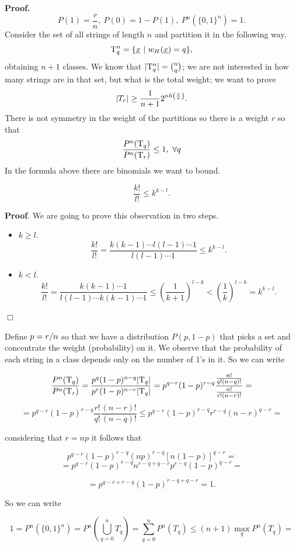 \noindent\textbf{Proof.} $$P(1) = \dfrac{r}{n},\ P(0) = 1 - P(1),\ P^n(\{0, 1\}^n) = 1.$$
Consider the set of all strings of length $n$ and partition it in the following way.
$$\mathrm{T}_q^n = \{\underline{x}\ |\ w_H(\underline{x}) = q\},$$
obtaining $n +1$ classes. 
We know that $|\mathrm{T}_q^n| = \binom{n}{q}$; we are not interested in how many strings are in that set, but what is the total weight; we want to prove $$ |T_r| \geq \dfrac{1}{n+1}2^{nh\left(\frac{r}{n}\right)}.$$ There is not symmetry in the weight of the partitions so there is a weight $r$ so that
$$ \dfrac{P^n(\mathrm{T}_q)}{P^n(\mathrm{T}_r)} \leq 1,\ \forall q$$
In the formula above there are binomials we want to bound.

\begin{obs}
	$$\dfrac{k!}{l!} \leq k^{k-l}.$$
\end{obs}

\noindent\textbf{Proof}. We are going to prove this observation in two steps.
\begin{itemize}
	\item $k \geq l$. 
	$$\dfrac{k!}{l!} = \dfrac{k(k-1) \cdots l(l -1) \cdots 1}{l(l -1) \cdots 1} \leq k^{k-l}.$$
	
	\item $k < l$.
	$$\dfrac{k!}{l!} = \dfrac{k(k-1) \cdots 1}{l(l -1) \cdots k(k-1) \cdots 1} \leq \left(\dfrac{1}{k+1}\right)^{l-k} < \left(\dfrac{1}{k}\right)^{l-k} = k^{k-l}.$$
\end{itemize}
\hfill$\Box$

Define $p = {r}/{n}$  so that we have a distribution $P(p, 1-p)$ that picks a set and concentrate the weight (probability) on it. We observe that the probability of each string in a class depends only on the number of $1$'s in it. So we can write

\[\dfrac{P^n(\mathrm{T}_q)}{P^n(\mathrm{T}_r)} = \dfrac{p^q(1-p)^{n-q}|\mathrm{T}_q|}{p^r(1-p)^{n-r}|\mathrm{T}_q|} = p^{q-r}(1-p)^{r-q} \dfrac{\frac{n!}{q!(n-q)!}}{\frac{n!}{r!(n-r)!}} = \]
\[ = p^{q-r}(1-p)^{r-q}\dfrac{r!}{q!}\dfrac{(n-r)!}{(n-q)!} \leq p^{q-r}(1-p)^{r-q}r^{r-q}(n-r)^{q-r} = \]

considering that $r = np$ it follows that

\[p^{q-r}(1-p)^{r-q} (np)^{r-q}[n(1-p)]^{q-r}= \] \[ = p^{q-r}(1-p)^{r-q}n^{r-q+q-r}p^{r-q}(1-p)^{q-r} = \]

\[ = p^{q-r + r-q}(1-p)^{r-q+q-r} = 1.\]

So we can write

\[1 = P^n(\{0,1\}^n) = P^n\left(\bigcup_{q=0}^nT_q\right) = \sum_{q=0}^nP^n(T_q)\leq(n+1) \max_qP^n(T_q) = \]

